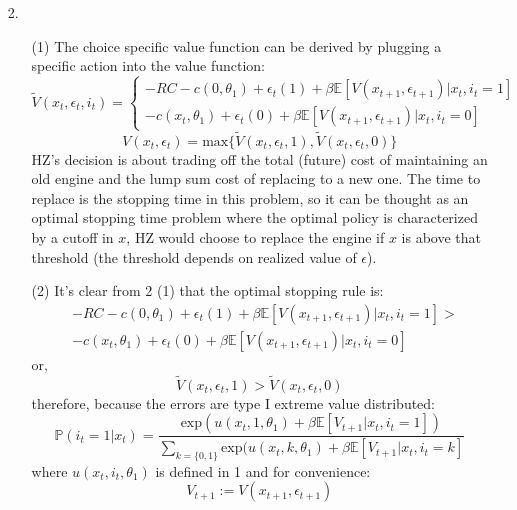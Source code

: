 \documentclass[paper=a4, fontsize=11pt]{scrartcl} %
\numberwithin{equation}{section} %
\numberwithin{figure}{section} %
\numberwithin{table}{section} %
\begin{document}
\begin{itemize}
\item[2.]
\begin{itemize}
\item[(1)] The choice specific value function can be derived by plugging a specific action into the value function:
\[\tilde{V}(x_t,\epsilon_t,i_t)=
\begin{cases}
-RC-c(0,\theta_1)+\epsilon_t(1) + \beta \mathbb{E}[V(x_{t+1},\epsilon_{t+1})|x_t, i_t=1] \\
-c(x_t,\theta_1)+\epsilon_t(0) + \beta \mathbb{E}[V(x_{t+1},\epsilon_{t+1})|x_t, i_t=0]
\end{cases}\]
\[V(x_t,\epsilon_t) = \text{max}\{\tilde{V}(x_t,\epsilon_t,1),\tilde{V}(x_t,\epsilon_t,0)\}\]
HZ's decision is about trading off the total (future) cost of maintaining an old engine and the lump sum cost of replacing to a new one. The time to replace is the stopping time in this problem, so it can be thought as an optimal stopping time problem where the optimal policy is characterized by a cutoff in $x$, HZ would choose to replace the engine if $x$ is above that threshold (the threshold depends on realized value of $\epsilon$).

\item[(2)] It's clear from 2 (1) that the optimal stopping rule is: 
\begin{align*}
&-RC-c(0,\theta_1)+\epsilon_t(1) + \beta \mathbb{E}[V(x_{t+1},\epsilon_{t+1})|x_t, i_t=1] >\\
&-c(x_t,\theta_1)+\epsilon_t(0) + \beta \mathbb{E}[V(x_{t+1},\epsilon_{t+1})|x_t, i_t=0]
\end{align*}
or, 
\[\tilde{V}(x_t,\epsilon_t,1) > \tilde{V}(x_t,\epsilon_t,0)\]
therefore, because the errors are type I extreme value distributed:
\[\mathbb{P}(i_t=1|x_t) = \frac{\text{exp}(u(x_t,1,\theta_1)+\beta \mathbb{E}[V_{t+1}|x_t, i_t=1])}{\sum_{k=\{0,1\}}\text{exp}(u(x_t,k,\theta_1)+\beta \mathbb{E}[V_{t+1}|x_t, i_t=k]}\tag{2.1}\]
where $u(x_t,i_t,\theta_1)$ is defined in 1 and for convenience:
\[V_{t+1} :=V(x_{t+1},\epsilon_{t+1})\]


\end{itemize}
\end{itemize}
\end{document}
